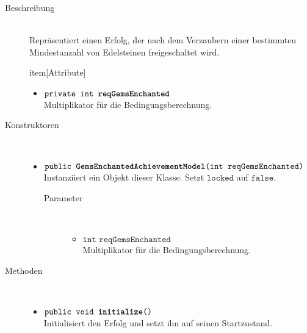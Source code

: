 \begin{description}
\item[Beschreibung] \hfill \\ Repräsentiert einen Erfolg, der nach dem Verzaubern einer bestimmten Mindestanzahl von Edelsteinen freigeschaltet wird.
	
item[Attribute] \hfill \\
	\vspace{-.8cm}
	\begin{itemize}
		\item $\texttt{private int \textbf{reqGemsEnchanted}}$ \\ Multiplikator für die Bedingungsberechnung.
	\end{itemize}	
	
\item[Konstruktoren] \hfill \\
	\vspace{-.8cm}
	\begin{itemize}
		\item $\texttt{public \textbf{GemsEnchantedAchievementModel}(int reqGemsEnchanted)}$ \\ Instanziiert ein Objekt dieser Klasse. Setzt $\texttt{locked}$ auf $\texttt{false}$.
		\begin{description}
			\item[Parameter] \hfill \\
			\vspace{-.8cm}
			\begin{itemize}
				\item $\texttt{int reqGemsEnchanted}$ \\ Multiplikator für die Bedingungsberechnung.
			\end{itemize}
		\end{description}
	\end{itemize}
	
\item[Methoden] \hfill \\
	\vspace{-.8cm}
	\begin{itemize}
		\item $\texttt{public void \textbf{initialize}()}$ \\ Initialisiert den Erfolg und setzt ihn auf seinen Startzustand.
		

\end{itemize}
\end{description}
